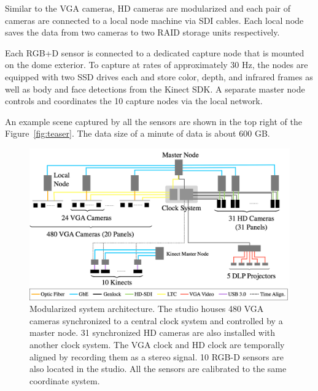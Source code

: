 Similar to the VGA cameras, HD cameras are modularized and each pair of cameras are connected to a local node machine via SDI cables. Each local node saves the data from two cameras to two RAID storage units respectively.


Each RGB+D sensor is connected to a dedicated capture node that is mounted on the dome exterior. To capture at rates of approximately 30 Hz, the nodes are equipped with two SSD drives each and store color, depth, and infrared frames as well as body and face detections from the Kinect SDK. A separate master node controls and coordinates the 10 capture nodes via the local network.
                                                                         
An example scene captured by all the sensors are shown in the top right of the Figure~\ref{fig:teaser}. The data size of a minute of data is about 600 GB. 

\begin{figure}[t]
	\includegraphics[width=\linewidth]{figures/Dome_architecture_0815}
	\caption{Modularized system architecture. The studio houses 480 VGA cameras synchronized to a central clock system and controlled by a master node. 31 synchronized HD cameras are also installed with another clock system. The VGA clock and HD clock are temporally aligned by recording them as a stereo signal. 10 RGB-D sensors are also located in the studio. All the sensors are calibrated to the same coordinate system.}
	\label{fig:architecture}
\end{figure}

